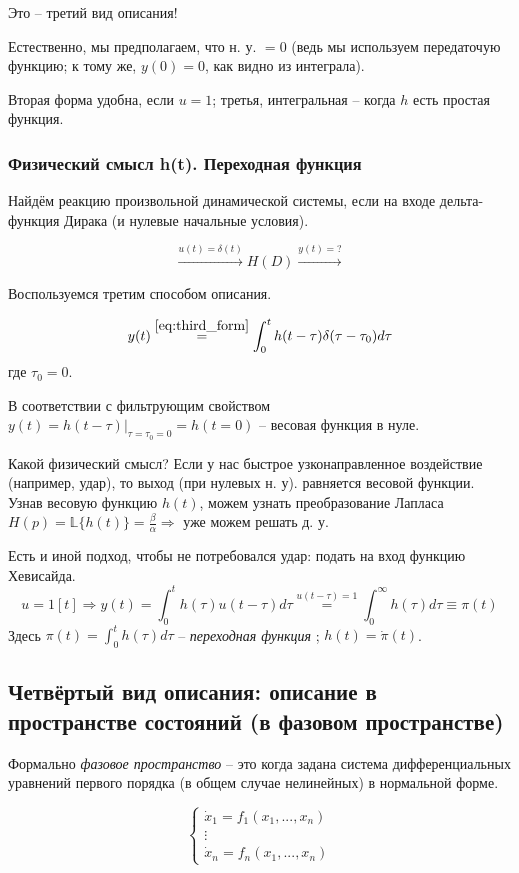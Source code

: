 \documentclass[main.tex]{subfiles}
\begin{document}
Это -- третий вид описания!

Естественно, мы предполагаем, что н. у. $ =0 $ (ведь мы используем передаточую функцию; к тому же, $ y(0) = 0 $, как видно из интеграла).

Вторая форма удобна, если $ u = 1 $; третья, интегральная -- когда $ h $ есть простая функция.

\subsubsection{Физический смысл h(t). Переходная функция}

Найдём реакцию произвольной динамической системы, если на входе дельта-функция Дирака (и нулевые начальные условия).

\[ \xrightarrow{u(t)=\delta(t)}\boxed{H(D)}\xrightarrow{y(t) = ?} \]

Воспользуемся третим способом описания.

$$ y(t) \overset{\eqref{eq:third_form}}= \int_0^t h(t-\tau)\delta(\tau-\tau_0) d\tau  $$
где $ \tau_0 = 0 $.

В соответствии с фильтрующим свойством $ y(t) = h(t-\tau)|_{\tau=\tau_0=0}=h(t=0) $ -- весовая функция в нуле.

Какой физический смысл?
Если у нас быстрое узконаправленное воздействие (например, удар), то выход (при нулевых н. у). равняется весовой функции.
Узнав весовую функцию $ h(t) $, можем узнать преобразование Лапласа $ H(p) = \mathds{L}\{h(t)\} = \frac{\beta}{\alpha} \Rightarrow $ уже можем решать д. у.

Есть и иной подход, чтобы не потребовался удар: подать на вход функцию Хевисайда.
$$ u = 1[t] \Rightarrow y(t) = \int_{0}^{t}  h(\tau) u(t-\tau) d\tau \overset{u(t-\tau)=1}= \int_{0}^{\infty} h(\tau) d\tau \equiv \pi(t) $$
Здесь $\pi(t) = \int_0^t h(\tau)d\tau $ -- \emph{ переходная функция }; $ h(t) = \dot \pi(t) $.

\subsection{Четвёртый вид описания: описание в пространстве состояний (в фазовом пространстве)}

Формально \emph{фазовое пространство} -- это когда задана система дифференциальных уравнений первого порядка (в общем случае нелинейных) в нормальной форме.

\[ \begin{cases}
    \dot x_1 = f_1(x_1, ..., x_n) \\
    \vdots \\
    \dot x_n = f_n(x_1, ..., x_n)
\end{cases} \]
\end{document}
